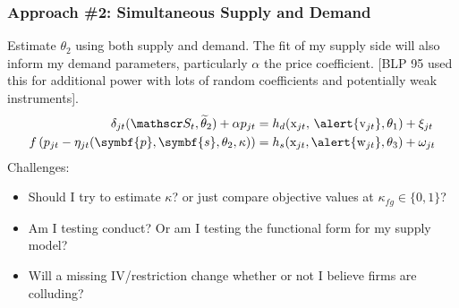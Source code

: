 \documentclass[aspectratio=169,10pt]{beamer}
\begin{document}
\begin{frame}
\frametitle{Approach \#2: Simultaneous Supply and Demand}
Estimate $\theta_2$ using both supply and demand. The fit of my supply side will also inform my demand parameters, particularly $\alpha$ the price coefficient. [BLP 95 used this for additional power with lots of random coefficients and potentially weak instruments].
\begin{align*}
\delta_{jt}(\calS_t,\widetilde{\theta}_2) + \alpha p_{jt} &= h_d(\textrm{x}_{jt}, \, \alert{\textrm{v}_{jt}},\theta_1)  + \xi_{jt} \\
 f \left( p_{jt} - \eta_{jt}(\symbf{p},\symbf{s},\theta_2,\kappa) \right) &= h_s(\textrm{x}_{jt}, \alert{\textrm{w}_{jt}},\theta_3) + \omega_{jt}
\end{align*}
Challenges:
\begin{itemize}
\item Should I try to estimate $\kappa$? or just compare objective values at $\kappa_{fg}\in\{0,1\}$?
\item Am I testing conduct? Or am I testing the functional form for my supply model?
\item Will a missing IV/restriction change whether or not I believe firms are colluding?
\end{itemize}
\end{frame}

\end{document}
